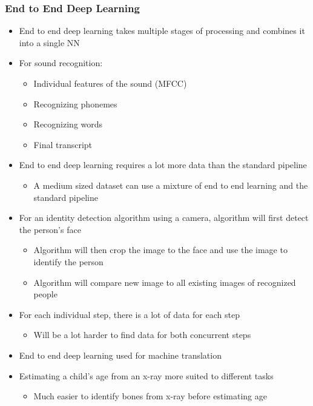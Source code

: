 \documentclass[12pt, letterpaper]{article}
\begin{document}
    \subsubsection{End to End Deep Learning}
    \begin{itemize}
        \item End to end deep learning takes multiple stages of processing and combines it into a single NN
        \item For sound recognition:
        \begin{itemize}
            \item Individual features of the sound (MFCC)
            \item Recognizing phonemes
            \item Recognizing words
            \item Final transcript
        \end{itemize}
        \item End to end deep learning requires a lot more data than the standard pipeline
        \begin{itemize}
            \item A medium sized dataset can use a mixture of end to end learning and the standard pipeline
        \end{itemize}
        \item For an identity detection algorithm using a camera, algorithm will first detect the person's face
        \begin{itemize}
            \item Algorithm will then crop the image to the face and use the image to identify the person
            \item Algorithm will compare new image to all existing images of recognized people
        \end{itemize}
        \item For each individual step, there is a lot of data for each step
        \begin{itemize}
            \item Will be a lot harder to find data for both concurrent steps
        \end{itemize}
        \item End to end deep learning used for machine translation 
        \item Estimating a child's age from an x-ray more suited to different tasks
        \begin{itemize}
            \item Much easier to identify bones from x-ray before estimating age

\end{itemize}
\end{itemize}
\end{document}
